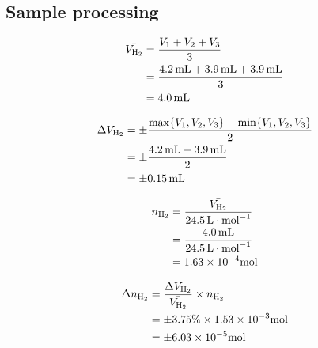 \documentclass[a4paper]{article}
\begin{document}
\subsection{Sample processing}

\begin{equation}
    \begin{aligned}
        \bar{V_{\ce{H2}}} &= \dfrac{V_1 + V_2 + V_3}{3} \\
                      &= \dfrac{\SI{4.2}{mL} + \SI{3.9}{mL} + \SI{3.9}{mL}}{3} \\ 
                      &= \SI{4.0}{mL} \\
    \end{aligned}
\end{equation}

\begin{equation}
    \begin{aligned}
        \Delta V_{\ce{H2}} &= \pm \dfrac{\max\{V_1, V_2, V_3\} - \min\{V_1, V_2, V_3\}}{2} \\
                       &= \pm \dfrac{\SI{4.2}{mL}-\SI{3.9}{mL}}{2} \\
                       &= \pm \SI{0.15}{mL} \\
    \end{aligned}
\end{equation}

\begin{equation}
    \begin{aligned}
        n_{\ce{H2}} &= \dfrac{\bar{V_{\ce{H2}}}}{\SI{24.5}{L\cdot mol^{-1}}}\\
                    &= \dfrac{\SI{4.0}{mL}}{\SI{24.5}{L\cdot mol^{-1}}}\\
                    &= 1.63 \times 10^{-4}\SI{}{mol}\\
    \end{aligned}
\end{equation}

\begin{equation}
    \begin{aligned}
        \Delta n_{\ce{H2}} &= \dfrac{\Delta V_{\ce{H2}}}{\bar{V_{\ce{H2}}}} \times n_{\ce{H2}}\\
                    &= \pm3.75\% \times 1.53 \times 10^{-3}\SI{}{mol}\\
                    &= \pm6.03 \times 10^{-5}\SI{}{mol}\\
    \end{aligned}
\end{equation}
\end{document}
